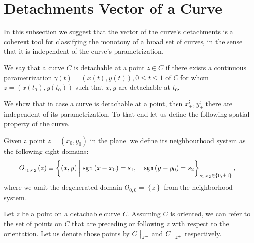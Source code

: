 \documentclass[11pt]{book}
\begin{document}
\section{Detachments Vector of a Curve}

In this subsection we suggest that the vector of the curve's
detachments is a coherent tool for classifying the monotony of a broad
set of curves, in the sense that it is independent of the curve's
parametrization.

\begin{definition}
We say that a curve $C$ is detachable
at a point $z\in C$ if there exists a continuous parametrization
$\gamma\left(t\right)=\left(x\left(t\right),y\left(t\right)\right),0\leq t\leq1$
of $C$ for whom $z=\left(x\left(t_{0}\right),y\left(t_{0}\right)\right)$
such that $x,y$ are detachable at $t_{0}$.
\end{definition}

We show that in case a
curve is detachable at a point, then $x_{\pm}^{;},y_{\pm}^{;}$ there
are independent of its parametrization. To that end let us define the
following spatial property of the curve.

\begin{definition}
Given a point $z=\left(x_{0},y_{0}\right)$
in the plane, we define its neighbourhood system as the following
eight domains:
\[
O_{s_{1},s_{2}}\left(z\right)\equiv\left\{ \left(x,y\right)\biggm\lvert \text{sgn}\left(x-x_{0}\right)=s_{1},\quad \text{sgn}\left(y-y_{0}\right)=s_{2}\right\} _{s_{1},s_{2}\in\left\{ 0,\pm1\right\} },
\]
where we omit the degenerated domain $O_{0,0}=\left\{ z\right\} $
from the neighborhood system.
\end{definition}

Let $z$ be a point on a detachable curve $C$. Assuming $C$ is oriented, we can refer to the set of points on $C$ that are preceding or following $z$ with respect to the orientation. Let us
denote those points by $C\bigm\lvert_{z^{-}}$ and $C\bigm\lvert_{z^{+}}$
respectively.
\end{document}

